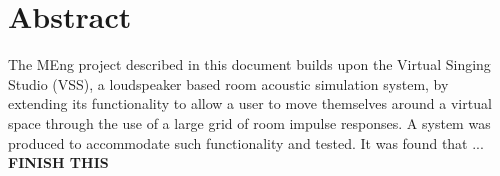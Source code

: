 \documentclass[../../main.tex]{subfiles}
\begin{document}
\clearpage
\thispagestyle{empty}
	
	\section{Abstract}

			 \vspace{5mm}
		 \begin{center}
		 \begin{minipage}{0.6\textwidth}
		 The MEng project described in this document builds upon the Virtual Singing Studio (VSS), a loudspeaker based room acoustic simulation system, by extending its functionality to allow a user to move themselves around a virtual space through the use of a large grid of room impulse responses. A system was produced to accommodate such functionality and tested. It was found that ... \textbf{FINISH THIS}

		 \end{minipage}
		 \end{center}
		 \vspace{5mm}
\end{document}
